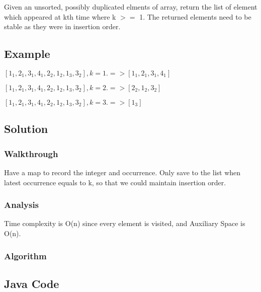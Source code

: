 \documentclass[]{book}
\begin{document}
Given an unsorted, possibly duplicated elments of array, return the list of element which appeared at kth
time where k \(>=\) 1. The returned elements need to be stable as they were in insertion order.

\hypertarget{example-11}{%
\subsection{Example}\label{example-11}}

\([1_1, 2_1, 3_1, 4_1, 2_2, 1_2, 1_3, 3_2], k = 1. => [1_1, 2_1, 3_1, 4_1]\)

\([1_1, 2_1, 3_1, 4_1, 2_2, 1_2, 1_3, 3_2], k = 2. => [2_2, 1_2, 3_2]\)

\([1_1, 2_1, 3_1, 4_1, 2_2, 1_2, 1_3, 3_2], k = 3. => [1_3]\)

\hypertarget{solution-9}{%
\subsection{Solution}\label{solution-9}}

\hypertarget{walkthrough-11}{%
\subsubsection{Walkthrough}\label{walkthrough-11}}

Have a map to record the integer and occurrence. Only save to the list when latest occurrence equals to k, so that
we could maintain insertion order.

\hypertarget{analysis-13}{%
\subsubsection{Analysis}\label{analysis-13}}

Time complexity is O(n) since every element is visited, and Auxiliary Space is O(n).

\hypertarget{algorithm-13}{%
\subsubsection{Algorithm}\label{algorithm-13}}

\hypertarget{java-code-11}{%
\subsection{Java Code}\label{java-code-11}}
\end{document}
